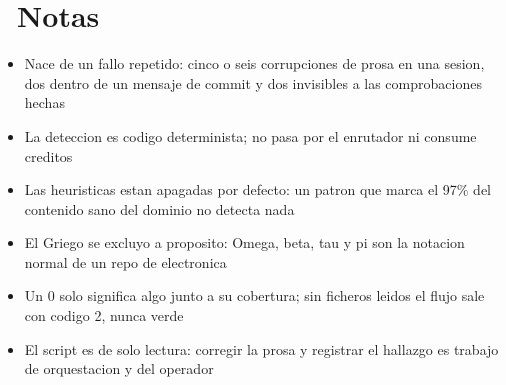 \documentclass[11pt,a4paper]{article}
\newcommand{\iconotexto}[2]{\textcolor{cyanNeon}{\faIcon{#1}}~#2}
\begin{document}
\section{\iconotexto{sticky-note}{Notas}}
\begin{itemize}
\item Nace de un fallo repetido: cinco o seis corrupciones de prosa en una sesion, dos dentro de un mensaje de commit y dos invisibles a las comprobaciones hechas
\item La deteccion es codigo determinista; no pasa por el enrutador ni consume creditos
\item Las heuristicas estan apagadas por defecto: un patron que marca el 97\% del contenido sano del dominio no detecta nada
\item El Griego se excluyo a proposito: Omega, beta, tau y pi son la notacion normal de un repo de electronica
\item Un 0 solo significa algo junto a su cobertura; sin ficheros leidos el flujo sale con codigo 2, nunca verde
\item El script es de solo lectura: corregir la prosa y registrar el hallazgo es trabajo de orquestacion y del operador
\end{itemize}

\end{document}
